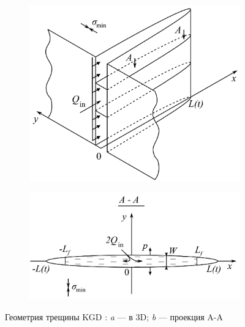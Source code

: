 \begin{figure}[H]
	\begin{subfigure}[t]{\dimexpr.5\linewidth-1.3em\relax}
		\centering
		\includegraphics[width=.95\linewidth,valign=t]{images/kgd_model_3D.jpg}
	\end{subfigure}
\hfill %
	\begin{subfigure}[t]{\dimexpr.5\linewidth-1.3em\relax}
		\centering
		\includegraphics[width=.95\linewidth,valign=t]{images/kgd_model_A-A_plane.jpg}
	\end{subfigure}
\captionsetup{justification=centering} %
\caption{Геометрия трещины KGD \cite{esipov}: {\itshape a} --- в 3D; {\itshape b} --- проекция A-A} 
\label{fig:kgd-model}
\end{figure}

